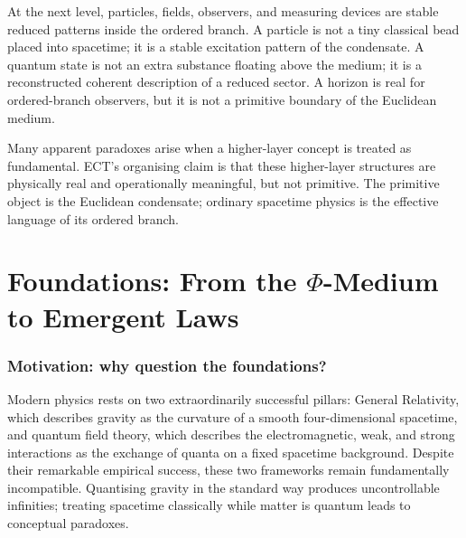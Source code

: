 \documentclass[11pt,a4paper]{article}
\begin{document}
At the next level, particles, fields, observers, and measuring
devices are stable reduced patterns inside the ordered branch. A
particle is not a tiny classical bead placed into spacetime; it is
a stable excitation pattern of the condensate. A quantum state is
not an extra substance floating above the medium; it is a
reconstructed coherent description of a reduced sector. A horizon
is real for ordered-branch observers, but it is not a primitive
boundary of the Euclidean medium.

Many apparent paradoxes arise when a higher-layer concept is treated
as fundamental. ECT's organising claim is that these higher-layer
structures are physically real and operationally meaningful, but not
primitive. The primitive object is the Euclidean condensate; ordinary
spacetime physics is the effective language of its ordered branch.

\medskip
\noindent{}
\medskip

\part{Foundations: From the $\Phi$-Medium to Emergent Laws}
\label{part:foundations_pop}

\section{Motivation: why question the foundations?}
\label{sec:pop_motivation}

Modern physics rests on two extraordinarily successful pillars: General Relativity, which describes gravity as the curvature of a smooth four-dimensional spacetime, and quantum field theory, which describes the electromagnetic, weak, and strong interactions as the exchange of quanta on a fixed spacetime background. Despite their remarkable empirical success, these two frameworks remain fundamentally incompatible. Quantising gravity in the standard way produces uncontrollable infinities; treating spacetime classically while matter is quantum leads to conceptual paradoxes.
\end{document}
